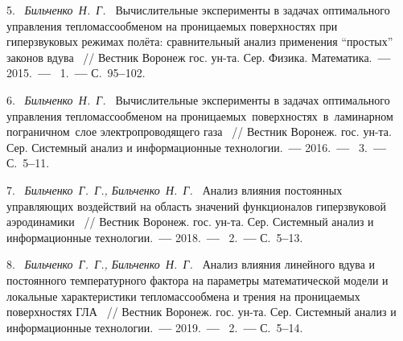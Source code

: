 	

5.~%
\textit%
{Бильченко~Н.~Г.~} 
{%
	{Вычислительные  
	эксперименты 
	в  
	задачах  
	оптимального  
	управления 
	тепломассообменом 
	на  проницаемых  поверхностях 
	при  гиперзвуковых  
	режимах  
	полёта:    сравнительный 
	анализ  применения 
	``простых''  законов  вдува}%
~/$\!$/
   Вестник  Воронеж  гос.  ун-та. 
	Сер.  Физика.  Математика.~{\textbf{---}} 
	2015.~{\textbf{---}} 
	\No~1.~{\textbf{---}}
	С.~95{\textbf{--}}102.%
	}



6.~%
\textit%
{Бильченко~Н.~Г.~}  
{%
  {Вычислительные  
   эксперименты  
   в  
   задачах  
   оптимального  
   управления  тепломассообменом 
   на  
   проницаемых\,  поверхностях\,   
   в\,  ламинарном\,   пограничном\,   
   слое 
   электропроводящего  газа}%
~/$\!$/ 
  Вестник  Воронеж.  гос.  ун-та. 
  Сер.  Системный  анализ 
  и  информационные  технологии.~{\textbf{---}} 
  2016.~{\textbf{---}} 
  \No~3.~{\textbf{---}} 
  С.~5{\textbf{--}}11.%
  }



7.~%
\textit%
{Бильченко~Г.~Г.,  
 Бильченко~Н.~Г.~}  
{%
  {Анализ  влияния  
  постоянных  
  управляющих  
  воздействий  
  на  
  область  
  значений  
  функционалов  
  гиперзвуковой  
  аэродинамики}%
~/$\!$/  
  Вестник  Воронеж.  гос.  ун-та.  
  Сер.  Системный  анализ  
  и  информационные  технологии.~{\textbf{---}}  
  2018.~{\textbf{---}}  
  \No~2.~{\textbf{---}}  
  С.~5{\textbf{--}}13.%
  }  



8.~%
\textit%
{Бильченко~Г.~Г.,  
 Бильченко~Н.~Г.~}  
{%
  {Анализ  влияния  
линейного  вдува
и  постоянного  температурного  фактора  
на  параметры  математической  модели  
и
локальные  характеристики  тепломассообмена  
и  трения 
на  проницаемых  поверхностях  ГЛА}%
~/$\!$/ 
  Вестник  Воронеж.  гос.  ун-та. 
  Сер.  Системный  анализ  
  и  информационные  технологии.~{\textbf{---}} 
  2019.~{\textbf{---}}  
  \No~2.~{\textbf{---}}  
  С.~5{\textbf{--}}14.%
  }  



